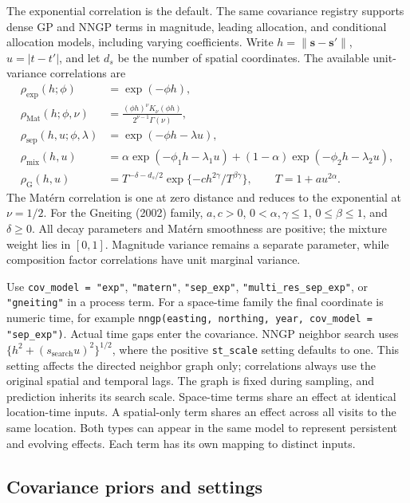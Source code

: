 \documentclass[11pt]{article}
\newcommand{\bs}{\bm{s}}
\begin{document}
The exponential correlation is the default. The same covariance registry
supports dense GP and NNGP terms in magnitude, leading allocation, and
conditional allocation models, including varying coefficients. Write
\(h=\|\bs-\bs'\|\), \(u=|t-t'|\), and let \(d_s\) be the number of spatial
coordinates. The available unit-variance correlations are
\begin{align}
 \rho_{\mathrm{exp}}(h;\phi)&=\exp(-\phi h),\\
 \rho_{\mathrm{Mat}}(h;\phi,\nu)&=
   \frac{(\phi h)^\nu K_\nu(\phi h)}{2^{\nu-1}\Gamma(\nu)},\\
 \rho_{\mathrm{sep}}(h,u;\phi,\lambda)&=\exp(-\phi h-\lambda u),\\
 \rho_{\mathrm{mix}}(h,u)&=\alpha\exp(-\phi_1h-\lambda_1u)
                   +(1-\alpha)\exp(-\phi_2h-\lambda_2u),\\
 \rho_{\mathrm{G}}(h,u)&=T^{-\delta-d_s/2}
                  \exp\{-c h^{2\gamma}/T^{\beta\gamma}\},
       \qquad T=1+a u^{2\alpha}.
 \label{eq:covariance-registry}
\end{align}
The Mat\'ern correlation is one at zero distance and reduces to the exponential
at \(\nu=1/2\). For the Gneiting (2002) family, \(a,c>0\),
\(0<\alpha,\gamma\leq1\), \(0\leq\beta\leq1\), and \(\delta\geq0\).
All decay parameters and Mat\'ern smoothness are positive; the mixture weight
lies in \([0,1]\). Magnitude variance remains a separate parameter, while
composition factor correlations have unit marginal variance.

Use \texttt{cov\_model = "exp"}, \texttt{"matern"}, \texttt{"sep\_exp"},
\texttt{"multi\_res\_sep\_exp"}, or \texttt{"gneiting"} in a process term.
For a space-time family the final coordinate is numeric time, for example
\texttt{nngp(easting, northing, year, cov\_model = "sep\_exp")}.
Actual time gaps enter the covariance. NNGP neighbor search uses
\(\{h^2+(s_{\mathrm{search}}u)^2\}^{1/2}\), where the positive
\texttt{st\_scale} setting defaults to one. This setting affects the directed
neighbor graph only; correlations always use the original spatial and temporal
lags. The graph is fixed during sampling, and prediction inherits its search
scale. Space-time terms share an effect at identical location-time inputs.
A spatial-only term shares an effect across all visits to the same location.
Both types can appear in the same model to represent persistent and evolving
effects. Each term has its own mapping to distinct inputs.

\subsection{Covariance priors and settings}
\end{document}
